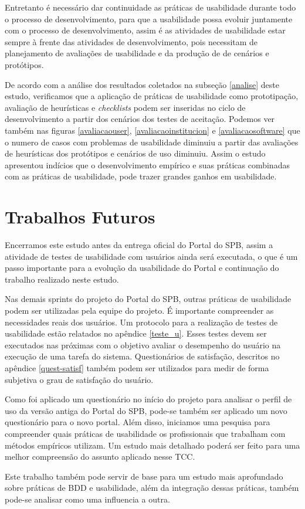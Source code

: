 Entretanto é necessário dar continuidade as práticas de usabilidade durante todo o processo de desenvolvimento, para que a usabilidade possa evoluir juntamente com o processo de desenvolvimento, assim é as atividades de usabilidade estar sempre à frente das atividades de desenvolvimento, pois necessitam de planejamento de avaliações de usabilidade e da produção de de cenários e protótipos.

De acordo com a análise dos resultados coletados na subseção \ref{analise} deste estudo, verificamos que a aplicação de práticas de usabilidade como prototipação, avaliação de heurísticas e \textit{checklists} podem ser inseridas no ciclo de desenvolvimento a partir dos cenários dos testes de aceitação. Podemos ver também nas figuras \ref{avaliacaouser}, \ref{avaliacaoinstitucion} e \ref{avaliacaosoftware} que o numero de casos com problemas de usabilidade diminuiu a partir das avaliações de heurísticas dos protótipos e cenários de uso diminuiu. Assim o estudo apresentou indícios que o desenvolvimento empírico e suas práticas combinadas com as práticas de usabilidade, pode trazer grandes ganhos em usabilidade.

\section{Trabalhos Futuros}

Encerramos este estudo antes da entrega oficial do Portal do SPB, assim a atividade de testes de usabilidade com usuários ainda será executada, o que é um passo importante para a evolução da usabilidade do Portal e continuação do trabalho realizado neste estudo.

Nas demais sprints do projeto do Portal do SPB, outras práticas de usabilidade podem ser utilizadas pela equipe do projeto. É importante compreender as necessidades reais dos usuários. Um protocolo para a realização de testes de usabilidade estão relatados no apêndice \ref{teste_u}.
%
Esses testes devem ser executados nas próximas com o objetivo avaliar o desempenho do usuário na execução de uma tarefa do sistema.
%
Questionários de satisfação, descritos no apêndice \ref{quest-satisf} também podem ser utilizados para medir de forma subjetiva o grau de satisfação do usuário.

Como foi aplicado um questionário no início do projeto para analisar o perfil de uso da versão antiga do Portal do SPB, pode-se também ser aplicado um novo questionário para o novo portal.
%
Além disso, iniciamos uma pesquisa para compreender quais práticas de usabilidade os profissionais que trabalham com métodos empíricos utilizam. Um estudo mais detalhado poderá ser feito para uma melhor compreensão do assunto aplicado nesse TCC. 

Este trabalho também pode servir de base para um estudo mais aprofundado sobre práticas de BDD e usabilidade, além da integração dessas práticas, também pode-se analisar como uma influencia a outra.
